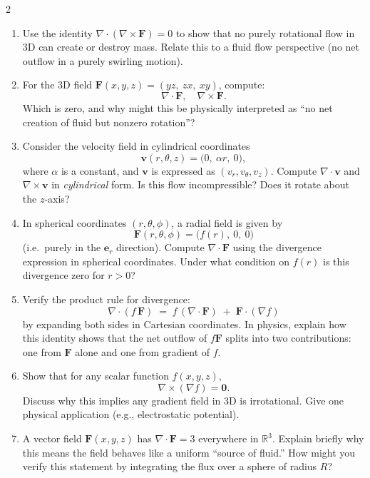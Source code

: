 \begin{multicols}{2}
\begin{enumerate}
\item \enspace
Use the identity $\nabla \cdot (\nabla \times \mathbf{F}) = 0$ to show that no purely rotational flow in 3D can create or destroy mass. Relate this to a fluid flow perspective (no net outflow in a purely swirling motion).

\item \enspace
For the 3D field $\mathbf{F}(x,y,z) = (yz,\ zx,\ xy)$, compute:
\[
\nabla \cdot \mathbf{F}, 
\quad 
\nabla \times \mathbf{F}.
\]
Which is zero, and why might this be physically interpreted as “no net creation of fluid but nonzero rotation”?

\item \enspace
Consider the velocity field in cylindrical coordinates
\[
\mathbf{v}(r,\theta,z) = \bigl(0,\ \alpha r,\ 0\bigr),
\]
where $\alpha$ is a constant, and $\mathbf{v}$ is expressed as $(v_r,v_\theta,v_z)$. Compute $\nabla \cdot \mathbf{v}$ and $\nabla \times \mathbf{v}$ in \emph{cylindrical} form. Is this flow incompressible? Does it rotate about the $z$-axis?

\item \enspace
In spherical coordinates $(r,\theta,\phi)$, a radial field is given by
\[
\mathbf{F}(r,\theta,\phi) = \bigl(f(r),\ 0,\ 0\bigr)
\]
(i.e.\ purely in the $\mathbf{e}_r$ direction). Compute $\nabla \cdot \mathbf{F}$ using the divergence expression in spherical coordinates. Under what condition on $f(r)$ is this divergence zero for $r>0$?

\item \enspace
Verify the product rule for divergence:
\[
\nabla \cdot (f\,\mathbf{F}) \;=\; f\,(\nabla \cdot \mathbf{F}) \;+\; \mathbf{F}\cdot (\nabla f)
\]
by expanding both sides in Cartesian coordinates. In physics, explain how this identity shows that the net outflow of $f\mathbf{F}$ splits into two contributions: one from $\mathbf{F}$ alone and one from gradient of $f$.

\item \enspace
Show that for any scalar function $f(x,y,z)$,
\[
\nabla \times (\nabla f) = \mathbf{0}.
\]
Discuss why this implies any gradient field in 3D is irrotational. Give one physical application (e.g., electrostatic potential).

\item \enspace
A vector field $\mathbf{F}(x,y,z)$ has $\nabla \cdot \mathbf{F} = 3$ everywhere in $\mathbb{R}^3$. Explain briefly why this means the field behaves like a uniform “source of fluid.” How might you verify this statement by integrating the flux over a sphere of radius $R$?


\end{enumerate}
\end{multicols}
